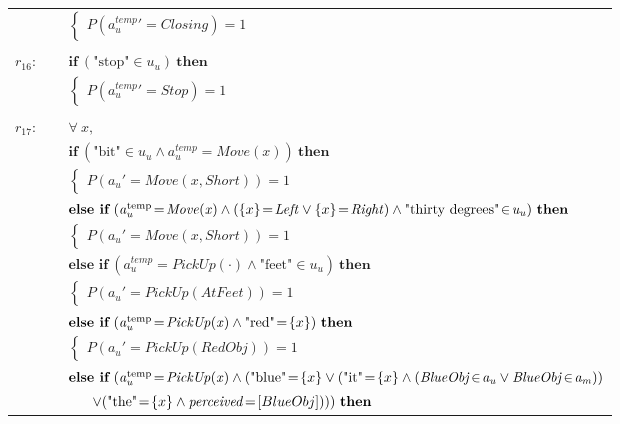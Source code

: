 \begin{footnotesize}
\begin{longtable}{p{1cm}l}
 & \;\;\;\;\; $ \begin{cases}P(\mathit{a_u^{\text{temp}}}'\!=\!\mathit{Closing})\!=\!1 \end{cases}$ \\ \\[-1mm]
$r_{16}$: \ \ & $ \textbf{if} \ (\text{"stop"}\!\in\!\mathit{u_u}) \ \textbf{then} $ \\
 & \;\;\;\;\; $ \begin{cases}P(\mathit{a_u^{\text{temp}}}'\!=\!\mathit{Stop})\!=\!1 \end{cases}$ \\ \\[-1mm]
$r_{17}$: \ \ & $\forall \ x, $ \\ & $ \textbf{if} \ (\text{"bit"}\!\in\!\mathit{u_u} \land \mathit{a_u^{\text{temp}}}\!=\!\mathit{Move({x})}) \ \textbf{then} $ \\
 & \;\;\;\;\; $ \begin{cases}P(\mathit{a_u}'\!=\!\mathit{Move({x},Short)})\!=\!1 \end{cases}$ \vspace{1mm} \\ & $ \textbf{else if} \ (\mathit{a_u^{\text{temp}}}\!=\!\mathit{Move({x})} \land (\mathit\{x\}\!=\!\mathit{Left} \lor \mathit\{x\}\!=\!\mathit{Right}) \land \text{"thirty degrees"}\!\in\!\mathit{u_u}) \ \textbf{then}$ \\
& \;\;\;\;\; $ \begin{cases}P(\mathit{a_u}'\!=\!\mathit{Move({x},Short)})\!=\!1 \end{cases}$ \vspace{1mm} \\ & $ \textbf{else if} \ (\mathit{a_u^{\text{temp}}}\!=\!\mathit{PickUp(\cdot)} \land \text{"feet"}\!\in\!\mathit{u_u}) \ \textbf{then}$ \\
& \;\;\;\;\; $ \begin{cases}P(\mathit{a_u}'\!=\!\mathit{PickUp(AtFeet)})\!=\!1 \end{cases}$ \vspace{1mm} \\ & $ \textbf{else if} \ (\mathit{a_u^{\text{temp}}}\!=\!\mathit{PickUp({x})} \land \text{"red"}\!=\!\mathit\{x\}) \ \textbf{then}$ \\
& \;\;\;\;\; $ \begin{cases}P(\mathit{a_u}'\!=\!\mathit{PickUp(RedObj)})\!=\!1 \end{cases}$ \vspace{1mm} \\ & $ \textbf{else if} \ (\mathit{a_u^{\text{temp}}}\!=\!\mathit{PickUp({x})} \land (\text{"blue"}\!=\!\mathit\{x\} \lor (\text{"it"}\!=\!\mathit\{x\} \land (\mathit{BlueObj}\!\in\!\mathit{a_u} \lor \mathit{BlueObj}\!\in\!\mathit{a_m})) $ \\ & $\ \ \ \ \ \lor (\text{"the"}\!=\!\mathit\{x\} \land \mathit{perceived}\!=\![BlueObj] ))) \ \textbf{then}$ \\

\end{longtable}
\end{footnotesize}
